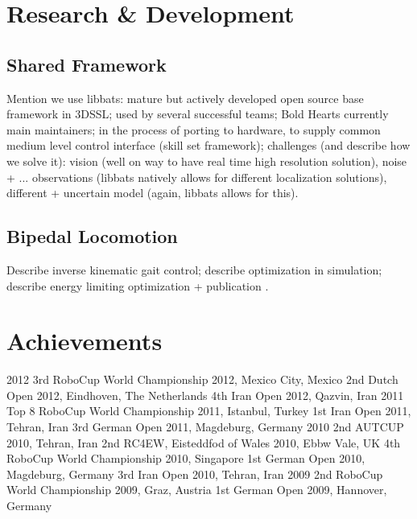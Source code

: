 \documentclass{llncs}
\begin{document}
\section{Research \& Development}
\label{sec:research}

\subsection{Shared Framework}
\label{sec:framework}

Mention we use libbats: mature but actively developed open source base
framework in 3DSSL; used by several successful teams; Bold Hearts
currently main maintainers; in the process of porting to hardware, to
supply common medium level control interface (skill set framework);
challenges (and describe how we solve it): vision (well on way to have
real time high resolution solution), noise + ... observations (libbats
natively allows for different localization solutions), different +
uncertain model (again, libbats allows for this).

\subsection{Bipedal Locomotion}
\label{sec:bipedal-locomotion}

Describe inverse kinematic gait control; describe optimization in
simulation; describe energy limiting optimization + publication
\cite{lattarulo_application_2011}.

\section{Achievements}
\label{sec:achievements}

2012
3rd RoboCup World Championship 2012, Mexico City, Mexico
2nd Dutch Open 2012, Eindhoven, The Netherlands
4th Iran Open 2012, Qazvin, Iran
2011
Top 8 RoboCup World Championship 2011, Istanbul, Turkey
1st Iran Open 2011, Tehran, Iran
3rd German Open 2011, Magdeburg, Germany
2010
2nd AUTCUP 2010, Tehran, Iran
2nd RC4EW, Eisteddfod of Wales 2010, Ebbw Vale, UK
4th RoboCup World Championship 2010, Singapore
1st German Open 2010, Magdeburg, Germany
3rd Iran Open 2010, Tehran, Iran
2009
2nd RoboCup World Championship 2009, Graz, Austria
1st German Open 2009, Hannover, Germany



\end{document}
